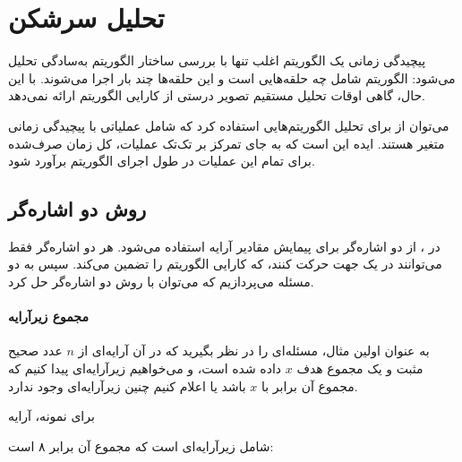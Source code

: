 \chapter{تحلیل سرشکن}


پیچیدگی زمانی یک الگوریتم
اغلب تنها با بررسی ساختار الگوریتم
به‌سادگی تحلیل می‌شود:
الگوریتم شامل چه حلقه‌هایی است
و این حلقه‌ها چند بار اجرا می‌شوند.
با این حال، گاهی اوقات تحلیل مستقیم
تصویر درستی از کارایی الگوریتم ارائه نمی‌دهد.

می‌توان از  برای تحلیل
الگوریتم‌هایی استفاده کرد که شامل عملیاتی با
پیچیدگی زمانی متغیر هستند.
ایده این است که به جای تمرکز بر تک‌تک عملیات،
کل زمان صرف‌شده برای تمام این عملیات در طول
اجرای الگوریتم برآورد شود.

\section{روش دو اشاره‌گر}


در ،
از دو اشاره‌گر برای
پیمایش مقادیر آرایه استفاده می‌شود.
هر دو اشاره‌گر فقط می‌توانند در یک جهت حرکت کنند،
که کارایی الگوریتم را تضمین می‌کند.
سپس به دو مسئله می‌پردازیم که می‌توان با
روش دو اشاره‌گر حل کرد.

\subsubsection{مجموع زیرآرایه}

به عنوان اولین مثال،
مسئله‌ای را در نظر بگیرید که در آن
آرایه‌ای از $n$ عدد صحیح مثبت
و یک مجموع هدف $x$ داده شده است،
و می‌خواهیم زیرآرایه‌ای پیدا کنیم که مجموع آن برابر با $x$ باشد
یا اعلام کنیم چنین زیرآرایه‌ای وجود ندارد.

برای نمونه، آرایه
\begin{center}
\end{center}
شامل زیرآرایه‌ای است که مجموع آن برابر ۸ است:
\begin{center}
\end{center}

